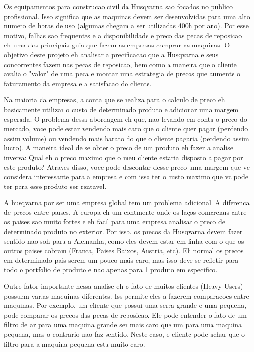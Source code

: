 \documentclass[12pt]{article}
\begin{document}
	Os equipamentos para construcao civil da Husqvarna sao focados no publico profissional. Isso significa que as maquinas devem ser desenvolvidas para uma alto numero de horas de uso (algumas chegam a ser utilizadas 400h por ano). Por esse motivo, falhas sao frequentes e a disponibilidade e preco das pecas de reposicao eh uma dos principais guia que fazem as empresas comprar as maquinas. O objetivo deste projeto eh analisar a precificacao que a Husqvarna e seus concorrentes fazem nas pecas de reposicao, bem como a maneira que o cliente avalia o "valor" de uma peca e montar uma estrategia de precos que aumente o faturamento da empresa e a satisfacao do cliente.

	Na maioria da empresas, a conta que se realiza para o calculo de preco eh basicamente utilizar o custo de determinado produto e adicionar uma margem esperada. O problema dessa abordagem eh que, nao levando em conta o preco do mercado, voce pode estar vendendo mais caro que o cliente quer pagar (perdendo assim volume) ou vendendo mais barato do que o cliente pagaria (perdendo assim lucro). A maneira ideal de se obter o preco de um produto eh fazer a analise inversa: Qual eh o preco maximo que o meu cliente estaria disposto a pagar por este produto? Atraves disso, voce pode descontar desse preco uma margem que vc considera interessante para a empresa e com isso ter o custo maximo que vc pode ter para esse produto ser rentavel.

	A husqvarna por ser uma empresa global tem um problema adicional. A diferenca de precos entre paises. A europa eh um continente onde os laços comerciais entre os paises sao muito fortes e eh facil para uma empresa analisar o preco de determinado produto no exterior. Por isso, os precos da Husqvarna devem fazer sentido nao soh para a Alemanha, como eles devem estar em linha com o que os outros paises cobram (Franca, Paises Baixos, Austria, etc). Eh normal os precos em determinado pais serem um pouco mais caro, mas isso deve se refletir para todo o portfolio de produto e nao apenas para 1 produto em especifico.

	Outro fator importante nessa analise eh o fato de muitos clientes (Heavy Users) possuem varias maquinas diferentes. Iss permite eles a fazerem comparacoes entre maquinas. Por exemplo, um cliente que possui uma serra grande e uma pequena, pode comparar os precos das pecas de reposicao. Ele pode entender o fato de um filtro de ar para uma maquina grande ser mais caro que um para uma maquina pequena, mas o contrario nao faz sentido. Neste caso, o cliente pode achar que o filtro para a maquina pequena esta muito caro.
\end{document}

